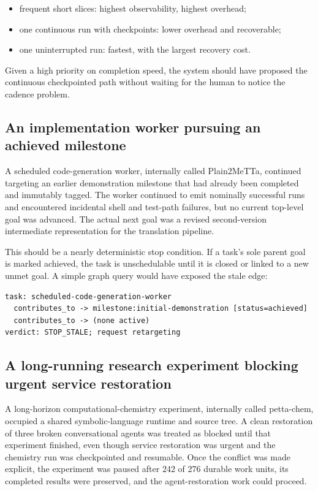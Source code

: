 \documentclass[11pt,letterpaper]{article}
\begin{document}
\begin{itemize}
  \item frequent short slices: highest observability, highest overhead;
  \item one continuous run with checkpoints: lower overhead and recoverable;
  \item one uninterrupted run: fastest, with the largest recovery cost.
\end{itemize}

Given a high priority on completion speed, the system should have proposed the
continuous checkpointed path without waiting for the human to notice the
cadence problem.

\subsection{An implementation worker pursuing an achieved milestone}

A scheduled code-generation worker, internally called Plain2MeTTa, continued
targeting an earlier demonstration milestone that had already been completed
and immutably tagged. The worker
continued to emit nominally successful runs and encountered incidental shell
and test-path failures, but no current top-level goal was advanced. The actual
next goal was a revised second-version intermediate representation for the
translation pipeline.

This should be a nearly deterministic stop condition. If a task's sole parent
goal is marked achieved, the task is unschedulable until it is closed or linked
to a new unmet goal. A simple graph query would have exposed the stale edge:

\begin{lstlisting}[style=plain]
task: scheduled-code-generation-worker
  contributes_to -> milestone:initial-demonstration [status=achieved]
  contributes_to -> (none active)
verdict: STOP_STALE; request retargeting
\end{lstlisting}

\subsection{A long-running research experiment blocking urgent service restoration}

A long-horizon computational-chemistry experiment, internally called
petta-chem, occupied a shared symbolic-language runtime and source tree. A
clean restoration of three broken conversational agents was treated as blocked
until that experiment finished, even though service restoration was urgent
and the chemistry run was checkpointed and resumable. Once the conflict was
made explicit, the experiment was paused after 242 of 276 durable work units,
its completed results were preserved, and the agent-restoration work could
proceed.
\end{document}
